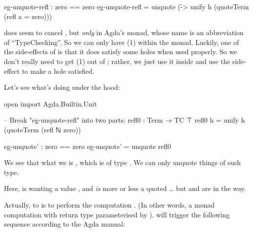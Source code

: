 \documentclass{article}
\newcommand{\superEmph}{\emph}
\begin{document}
\begin{code}
eg-unquote-refl : zero == zero
eg-unquote-refl = unquote (\h -> unify h (quoteTerm (refl {a = zero})))
\end{code}

 does seem to cancel , but \superEmph{only} in Agda's  monad, whose name is an abbreviation of ``TypeChecking''. So we can only have (1) within the  monad. Luckily, one of the side-effects of  is that it does satisfy some holes when used properly. So we don't really need to get (1) out of ; rather, we just use it inside and use the side-effect to make a hole satisfied.

Let's see what's  doing under the hood:

\begin{code}
open import Agda.Builtin.Unit

-- Break "eg-unquote-refl" into two parts:
refl0 : Term → TC ⊤
refl0 h = unify h (quoteTerm (refl {ℕ} {zero}))

eg-unquote' : zero == zero
eg-unquote' = unquote refl0
\end{code}

We see that what we  is , which is of type  \AgdaSymbol{->}  . We can only unquote things of such type.

Here,  is wanting a value , and  \emph{is} more or less a quoted \ldots{} but  and  are in the way.

Actually, to  is to perform the computation  \AgdaSymbol{:}    . (In other words, a  monad computation with return type  parameterised by ).  will trigger the following sequence according to the Agda manual:
\end{document}
